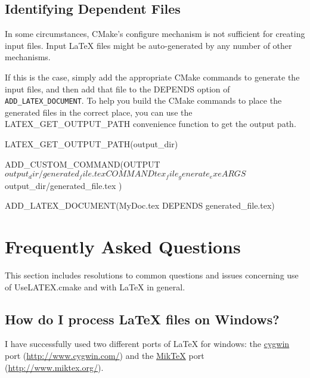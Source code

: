 \documentclass{article}
\newcommand*{\textfile}[1]{\textsf{#1}}
\newcommand*{\textcmake}[1]{\texttt{#1}}
\newcommand*{\UseLATEX}{\textfile{UseLATEX.cmake}\xspace}
\newcommand*{\latex}{\LaTeX\xspace}
\newcommand*{\miktex}{Mik\TeX\xspace}
\newcommand*{\ald}{\textcmake{ADD\_LATEX\_DOCUMENT}\xspace}
\begin{document}
  \subsection{Identifying Dependent Files}
  \label{sec:IdentifyingDependentFiles}

  In some circumstances, CMake's configure mechanism is not sufficient for
  creating input files.  Input \latex files might be auto-generated by any
  number of other mechanisms.

  If this is the case, simply add the appropriate CMake commands to
  generate the input files, and then add that file to the DEPENDS option of
  \ald.  To help you build the CMake commands to place the generated files
  in the correct place, you can use the LATEX\_GET\_OUTPUT\_PATH convenience
  function to get the output path.

  \begin{CodeListing}
LATEX_GET_OUTPUT_PATH(output_dir)

ADD_CUSTOM_COMMAND(OUTPUT ${output_dir}/generated_file.tex
  COMMAND tex_file_generate_exe
  ARGS ${output_dir}/generated_file.tex
  )

ADD_LATEX_DOCUMENT(MyDoc.tex DEPENDS generated_file.tex)
  \end{CodeListing}


  \section{Frequently Asked Questions}
  \label{sec:FrequentlyAskedQuestions}

  This section includes resolutions to common questions and issues
  concerning use of \UseLATEX and with \latex in general.

  \subsection{How do I process \latex files on Windows?}
  \label{sec:How_do_I_process_latex_files_on_Windows}

  I have successfully used two different ports of LaTeX for windows: the
  \href{http://www.cygwin.com/}{cygwin} port
  (\href{http://www.cygwin.com/}{http://www.cygwin.com/}) and the
  \href{http://www.miktex.org/}{\miktex} port
  (\href{http://www.miktex.org/}{http://www.miktex.org/}).
\end{document}
